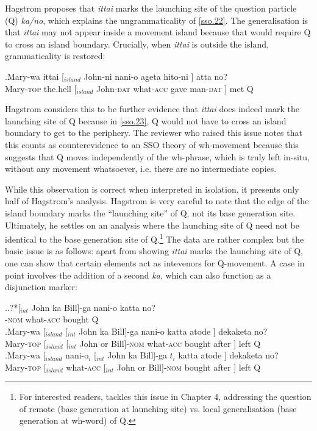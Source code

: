 \documentclass{glossa}
\begin{document}
Hagstrom proposes that \textit{ittai} marks the launching site of the question particle (Q) \textit{ka/no}, which explains the ungrammaticality of \ref{sso.22}. The generalisation is that \textit{ittai} may not appear inside a movement island because that would require Q to cross an island boundary. Crucially, when \textit{ittai} is outside the island, grammaticality is restored:

\exg.\label{sso.23}Mary-wa ittai [$_{island}$ John-ni nani-o ageta hito-ni ] atta no?\\
   Mary-\textsc{top} the.hell [$_{island}$ John-\textsc{dat} what-\textsc{acc} gave man-\textsc{dat} ] met Q\\

Hagstrom considers this to be further evidence that \textit{ittai} does indeed mark the launching site of Q because in \ref{sso.23}, Q would not have to cross an island boundary to get to the periphery. The reviewer who raised this issue notes that this counts as counterevidence to an SSO theory of wh-movement because this suggests that Q moves independently of the wh-phrase, which is truly left in-situ, without any movement whatsoever, i.e. there are no intermediate copies.

While this observation is correct when interpreted in isolation, it presents only half of Hagstrom's analysis. Hagstrom is very careful to note that the edge of the island boundary marks the ``launching site'' of Q, not its base generation site. Ultimately, he settles on an analysis where the launching site of Q need not be identical to the base generation site of Q.\footnote{For interested readers, \cite{hagstrom:1998} tackles this issue in Chapter 4, addressing the question of remote (base generation at launching site) vs. local generalisation (base generation at wh-word) of Q.} The data are rather complex but the basic issue is as follows: apart from showing \textit{ittai} marks the launching site of Q, one can show that certain elements act as intevenors for Q-movement. A case in point involves the addition of a second \textit{ka}, which can also function as a disjunction marker:

\ex.\ag.?*\label{sso.24a}[$_{int}$ John ka Bill]-ga nani-o katta no?\\
      [$_{int}$ John or Bill]-\textsc{nom} what-\textsc{acc} bought Q\\
   \bg.\label{sso.24b}Mary-wa [$_{island}$ [$_{int}$ John ka Bill]-ga nani-o katta atode ] dekaketa no?\\
      Mary-\textsc{top} [$_{island}$ [$_{int}$ John or Bill]-\textsc{nom} what-\textsc{acc} bought after ] left Q\\
   \bg.\label{sso.24c}Mary-wa [$_{island}$ nani-o$_i$ [$_{int}$ John ka Bill]-ga $t_i$ katta atode ] dekaketa no?\\
      Mary-\textsc{top} [$_{island}$ what-\textsc{acc} [$_{int}$ John or Bill]-\textsc{nom} {} bought after ] left Q\\
\end{document}
